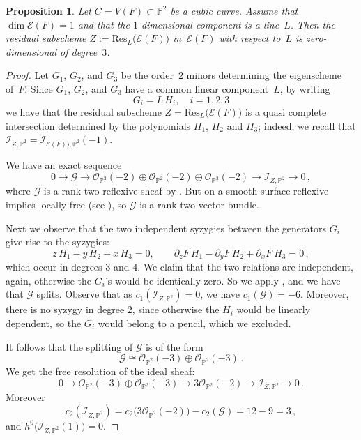 \documentclass{amsart}
\theoremstyle{plain}
\newtheorem{prop}[lemma]{Proposition}
\theoremstyle{definition}
\newcommand{\p}{\mathbb{P}}
\newcommand{\oo}{\mathcal{O}}
\newcommand{\Eig}[1]{\mathcal{E}\!\left( {#1} \right)}
\begin{document}
\begin{prop}\label{p2}
Let $C = V(F) \subset \p^2$ be a cubic curve.
Assume that $\dim \Eig{F} = 1$ and that the $1$-dimensional component is a line~$L$.
Then the residual subscheme $Z := \mathrm{Res}_L \bigl( \Eig{F} \bigr)$ in~$\Eig{F}$ with respect to~$L$ is zero-dimensional of degree~$3$.
\end{prop}
\begin{proof}
Let $G_1$, $G_2$, and $G_3$ be the order~$2$ minors determining the eigenscheme of~$F$.
Since $G_1$, $G_2$, and $G_3$ have a common linear component~$L$, by writing
\[
 G_i = L \, H_i, \quad i=1,2,3
\]
we have that the residual subscheme $Z = \mathrm{Res}_L \bigl( \Eig{F} \bigr)$ is a quasi complete intersection
determined by the polynomials $H_1$, $H_2$ and $H_3$; indeed, we recall that $\mathcal{I}_{Z, \p^2} = \mathcal{I}_{\Eig{F}), \p^2} (-1)$.

We have an exact sequence
\[
 0 \to \mathcal{G} \to \oo_{\p^2} (-2) \oplus \oo_{\p^2} (-2) \oplus \oo_{\p^2} (-2) \to \mathcal{I}_{Z,\p^2} \to 0 \,,
\]
where $\mathcal{G}$ is a rank two reflexive sheaf by \cite[Proposition 1]{Hartshorne1980}.
But on a smooth surface reflexive implies locally free (see \cite[Example~1.1.6]{Huybrechts2010}),
so $\mathcal{G}$ is a rank two vector bundle.

Next we observe that the two independent
syzygies between the generators $G_i$ give rise to the syzygies:
\[
z\, H_1 - y\, H_2 + x\, H_3 = 0, \qquad \partial_z F\, H_1 - \partial_y F \, H_2 + \partial_x F \ H_3=0 \,,
\]
which occur in degrees $3$ and $4$. We claim that the two relations are independent, again,
otherwise the $G_i$'s would be identically zero. So we apply \cite[Proposition~12]{Ellia2020}, and we have that $\mathcal {G}$ splits. Observe that as $c_1(\mathcal {I}_{Z,\p^2})=0$, we have $c_1(\mathcal {G})=-6$. Moreover, there is no syzygy in degree $2$, since
otherwise the $H_i$ would be linearly dependent, so the $G_i$ would belong to a pencil, which we excluded.

It follows that the splitting of $\mathcal{G}$ is of the form
%
\[
\mathcal{G} \cong \oo_{\p^2} (-3) \oplus \oo_{\p^2} (-3) \,.
\]
%
We get the free resolution of the ideal sheaf:
%
\[
0\to \oo_{\p^2} (-3)\oplus \oo_{\p^2} (-3) \to 3\oo_{\p^2} (-2)\to \mathcal {I}_{Z,\p^2} \to 0 \,.
\]
%
Moreover
%
\[
c_2 (\mathcal{I}_{Z,\p^2} ) = c_2 \bigl( 3\oo_{\p^2}(-2) \bigr) - c_2 (\mathcal{G}) = 12 - 9 = 3 \,,
\]
%
and $h^0 \bigl( \mathcal{I}_{Z,\p^2}(1) \bigr) = 0$.
\end{proof}
\end{document}
